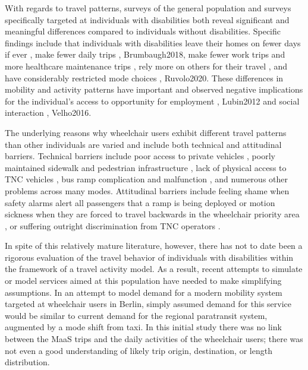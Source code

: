 \documentclass[3p, authoryear, review]{elsarticle} %
\begin{document}
With regards to travel patterns, surveys of the general population and surveys
specifically targeted at individuals with disabilities both reveal significant and
meaningful differences compared to individuals without disabilities. Specific
findings include that individuals with disabilities leave their homes on fewer
days if ever \citet{Sweeney2004}, make fewer daily trips
\citet{Schmocker2005}, Brumbaugh2018, make fewer work trips and more
healthcare maintenance trips \citet{Ermagun2016}, rely more on others for their travel \citet{Sweeney2004},
and have considerably restricted mode
choices \citet{Rosenbloom2007}, Ruvolo2020. These differences in mobility and activity patterns
have important and observed negative implications for the individual's access to
opportunity for employment \citet{Rosenbloom2007}, Lubin2012 and social interaction
\citet{Bascom2017}, Velho2016.

The underlying reasons why wheelchair users exhibit different travel patterns
than other individuals are varied and include both technical and attitudinal
barriers. Technical barriers include poor access to private vehicles
\citet{VanRoosmalen2010}, poorly maintained sidewalk and pedestrian infrastructure
\citet{frackelton2013measuring}, lack of physical access to TNC
vehicles \citet{Ruvolo2020}, bus ramp complication and malfunction \citet{Velho2016},
and numerous other problems across many modes.
Attitudinal barriers include feeling shame when safety alarms alert all
passengers that a ramp is being deployed or motion sickness when they are forced
to travel backwards in the wheelchair priority area \citet{Velho2016}, or
suffering outright discrimination from TNC operators \citet{Bascom2017}.

In spite of this relatively mature literature, however, there has not to
date been a rigorous evaluation of the travel behavior of individuals with
disabilities within the framework of a travel activity model. As a result,
recent attempts to simulate or model services aimed at this population have
needed to make simplifying assumptions. In an attempt to model demand for a
modern mobility
system targeted at wheelchair users in
Berlin, \citet{Bischoff2019} simply assumed demand for this service
would be similar to current demand for the regional paratransit system, augmented
by a mode shift from taxi. In this initial study there was no link between the
MaaS trips and the daily activities of the wheelchair users; there was not even a
good understanding of likely trip origin, destination, or length distribution.
\end{document}
